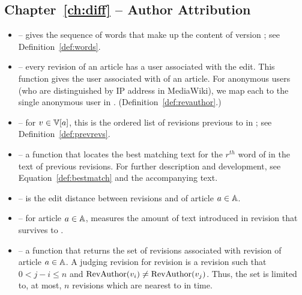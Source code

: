 \subsection{Chapter~\ref{ch:diff} -- Author Attribution}

\begin{itemize}

\item \words{\version{}} -- gives the sequence of words that make
    up the content of version \version{}; see
    Definition~\ref{def:words}.

\item \revauthor{\version{}} -- every revision of an article has
    a user associated with the edit.
    This function gives the user associated with \version{} of
    an article.
    For anonymous users (who are distinguished by IP address in
    MediaWiki), we map each to the single anonymous user in \users.
    (Definition~\ref{def:revauthor}.)

\item \prevrevs{\version{}} -- for $\version{} \in \versions{a}$,
    this is the ordered list of revisions previous to \version{}
    in ; see Definition~\ref{def:prevrevs}.

\item {} -- a function
    that locates the best matching text for the $r^{th}$ word of
     in the text of previous revisions.
    For further description and development, see
    Equation~\ref{def:bestmatch} and the accompanying text.

\item {} -- is the edit distance between revisions
     and  of article $a \in \mathbb{A}$.

\item {} -- for article $a \in \mathbb{A}$, measures the
    amount of text introduced in revision 
    that survives to .

\item {} -- a function that returns the set of
     revisions associated with revision 
    of article $a \in \mathbb{A}$.
    A judging revision for revision  is a revision 
    such that $0 < j - i \le n$ and
    $\mathrm{RevAuthor}(v_{i}) \not= \mathrm{RevAuthor}(v_{j})$.
    Thus, the set is limited to, at most, $n$ revisions which are nearest
    to  in time.

\end{itemize}


\renewcommand{\labelitemi}{$\bullet$}



